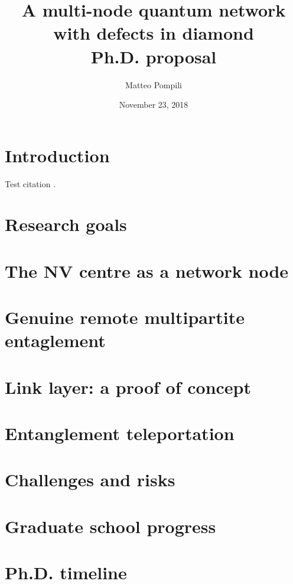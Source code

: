 \documentclass[]{article}
\title{
	\huge{A multi-node quantum network \\with defects in diamond}\\
	\vspace{10pt}\Large{Ph.D. proposal}
}
\author{Matteo Pompili}
\date{November 23, 2018}
\begin{document}
\maketitle

\section*{Introduction}
Test citation \cite{Humphreys2018}.

\tableofcontents

\section{Research goals}

\section{The NV centre as a network node}

\section{Genuine remote multipartite entaglement}

\section{Link layer: a proof of concept}

\section{Entanglement teleportation}

\section{Challenges and risks}

\section{Graduate school progress}

\section{Ph.D. timeline}

\printbibliography[heading=bibintoc]
\end{document}
